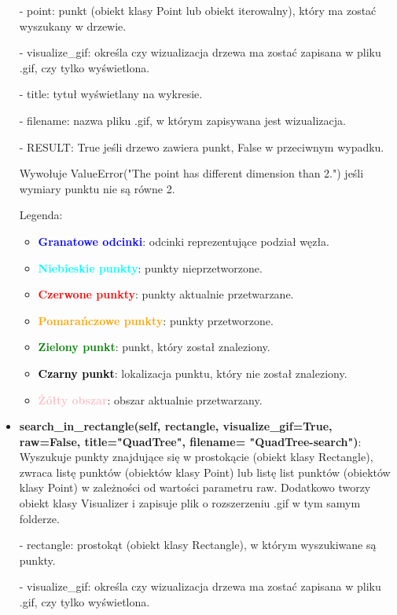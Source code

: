 \documentclass{lab}
\begin{document}
\begin{itemize}
  - point: punkt (obiekt klasy Point lub obiekt iterowalny), który ma zostać wyszukany w drzewie.

  - visualize\_gif: określa czy wizualizacja drzewa ma zostać zapisana w pliku .gif, czy tylko wyświetlona.

  - title: tytuł wyświetlany na wykresie.

  - filename: nazwa pliku .gif, w którym zapisywana jest wizualizacja.

  - RESULT: True jeśli drzewo zawiera punkt, False w przeciwnym wypadku.

  Wywołuje ValueError("The point has different dimension than 2.") jeśli wymiary punktu nie są równe 2.

  Legenda:
  \begin{itemize}
      \item \textbf{\textcolor{blue}{Granatowe odcinki}}: odcinki reprezentujące podział węzła.
      \item \textbf{\textcolor{cyan}{Niebieskie punkty}}: punkty nieprzetworzone.
      \item \textbf{\textcolor{red}{Czerwone punkty}}: punkty aktualnie przetwarzane.
      \item \textbf{\textcolor{orange}{Pomarańczowe punkty}}: punkty przetworzone.
      \item \textbf{\textcolor{green}{Zielony punkt}}: punkt, który został znaleziony.
      \item \textbf{\textcolor{black}{Czarny punkt}}: lokalizacja punktu, który nie został znaleziony.
      \item \textbf{\textcolor{pink}{Żółty obszar}}: obszar aktualnie przetwarzany.
  \end{itemize}

  \item \textbf{search\_in\_rectangle(self, rectangle, visualize\_gif=True, raw=False, title="QuadTree", filename= "QuadTree-search")}:
  Wyszukuje punkty znajdujące się w prostokącie (obiekt klasy Rectangle), zwraca listę punktów (obiektów klasy Point) lub listę list punktów (obiektów klasy Point) w zależności od wartości parametru raw. Dodatkowo tworzy obiekt klasy Visualizer i zapisuje plik o rozszerzeniu .gif w tym samym folderze.

  - rectangle: prostokąt (obiekt klasy Rectangle), w którym wyszukiwane są punkty.

  - visualize\_gif: określa czy wizualizacja drzewa ma zostać zapisana w pliku .gif, czy tylko wyświetlona.


\end{itemize}
\end{document}

